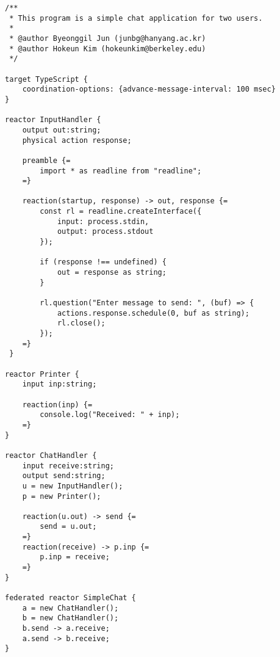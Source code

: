 \documentclass{article}
\begin{document}
\begin{verbatim}
/**
 * This program is a simple chat application for two users.
 *
 * @author Byeonggil Jun (junbg@hanyang.ac.kr)
 * @author Hokeun Kim (hokeunkim@berkeley.edu)
 */

target TypeScript {
    coordination-options: {advance-message-interval: 100 msec}
}

reactor InputHandler {
    output out:string;
    physical action response;
  
    preamble {=
        import * as readline from "readline";
    =}
  
    reaction(startup, response) -> out, response {=
        const rl = readline.createInterface({
            input: process.stdin,
            output: process.stdout
        });

        if (response !== undefined) {
            out = response as string;
        }
  
        rl.question("Enter message to send: ", (buf) => {
            actions.response.schedule(0, buf as string);
            rl.close();
        });
    =}
 }

reactor Printer {
    input inp:string;

    reaction(inp) {=
        console.log("Received: " + inp);
    =}
}

reactor ChatHandler {
    input receive:string;
    output send:string;
    u = new InputHandler();
    p = new Printer();
    
    reaction(u.out) -> send {=
        send = u.out;
    =}
    reaction(receive) -> p.inp {=
        p.inp = receive;
    =}
}

federated reactor SimpleChat {
    a = new ChatHandler();
    b = new ChatHandler();
    b.send -> a.receive;
    a.send -> b.receive;
}

\end{verbatim}
\end{document}
